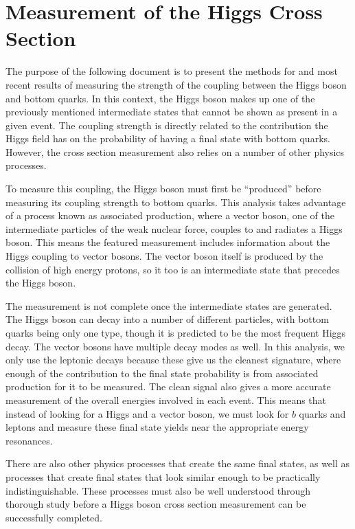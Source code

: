 \section{Measurement of the Higgs Cross Section}

The purpose of the following document is to present the methods for and
most recent results of measuring the strength of the coupling between the Higgs boson and bottom quarks.
In this context, the Higgs boson makes up one of the previously mentioned
intermediate states that cannot be shown as present in a given event.
The coupling strength is directly related to the contribution
the Higgs field has on the probability of having a final state with bottom quarks.
However, the cross section measurement also relies on a number of other physics processes.

To measure this coupling, the Higgs boson must first be ``produced''
before measuring its coupling strength to bottom quarks.
This analysis takes advantage of a process known as associated production,
where a vector boson, one of the intermediate particles of the weak nuclear force,
couples to and radiates a Higgs boson.
This means the featured measurement includes information about the Higgs coupling to vector bosons.
The vector boson itself is produced by the collision of high energy protons,
so it too is an intermediate state that precedes the Higgs boson.

The measurement is not complete once the intermediate states are generated.
The Higgs boson can decay into a number of different particles,
with bottom quarks being only one type, though it is predicted to be the most frequent Higgs decay.
The vector bosons have multiple decay modes as well.
In this analysis, we only use the leptonic decays because
these give us the cleanest signature,
where enough of the contribution to the final state probability
is from associated production for it to be measured.
The clean signal also gives a more accurate measurement of the overall energies involved in each event.
This means that instead of looking for a Higgs and a vector boson, we must look for $b$ quarks and leptons and
measure these final state yields near the appropriate energy resonances.

There are also other physics processes that create the same final states,
as well as processes that create final states that look similar enough
to be practically indistinguishable.
These processes must also be well understood through thorough study before a Higgs boson cross section measurement
can be successfully completed.

